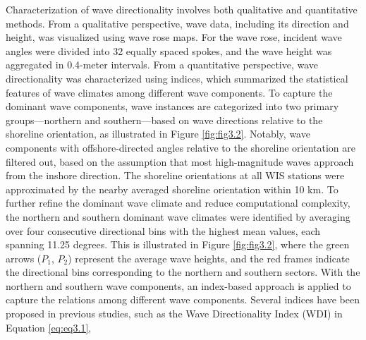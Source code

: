 Characterization of wave directionality involves both qualitative and
quantitative methods. From a qualitative perspective, wave data, including its
direction and height, was visualized using wave rose maps. For the wave rose,
incident wave angles were divided into 32 equally spaced spokes, and the wave
height was aggregated in 0.4-meter intervals. From a quantitative perspective,
wave directionality was characterized using indices, which summarized the
statistical features of wave climates among different wave components. To
capture the dominant wave components, wave instances are categorized into two
primary groups—northern and southern—based on wave directions relative to the
shoreline orientation, as illustrated in Figure \ref{fig:fig3.2}. Notably, wave
components with offshore-directed angles relative to the shoreline orientation
are filtered out, based on the assumption that most high-magnitude waves
approach from the inshore direction. The shoreline orientations at all WIS
stations were approximated by the nearby averaged shoreline orientation within
10 km. To further refine the dominant wave climate and reduce computational
complexity, the northern and southern dominant wave climates were identified by
averaging over four consecutive directional bins with the highest mean values,
each spanning 11.25 degrees. This is illustrated in Figure \ref{fig:fig3.2},
where the green arrows ($P_1$, $P_2$) represent the average wave heights, and
the red frames indicate the directional bins corresponding to the northern and
southern sectors. With the northern and southern wave components, an index-based
approach is applied to capture the relations among different wave components.
Several indices have been proposed in previous studies, such as the Wave
Directionality Index (WDI)
\citep{wiggins_coastal_2019,wiggins_regionally-coherent_2019} in Equation
\ref{eq:eq3.1},

